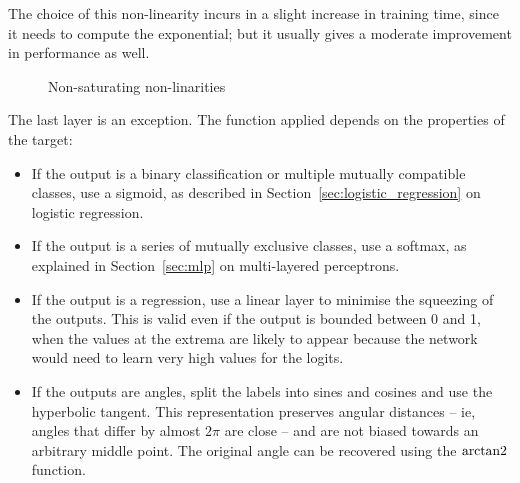 The choice of this non-linearity incurs in a slight increase in training time, since it needs to compute the exponential; but it usually gives a moderate improvement in performance as well.

\begin{figure}[tb]
    \centering
	\hfil
	\caption{Non-saturating non-linarities}\label{fig:non_linear2}
\end{figure}

The last layer is an exception.
The function applied depends on the properties of the target:
\begin{itemize}
\item If the output is a binary classification or multiple mutually compatible classes, use a sigmoid, as described in Section~\ref{sec:logistic_regression} on logistic regression.
\item If the output is a series of mutually exclusive classes, use a softmax, as explained in Section~\ref{sec:mlp} on multi-layered perceptrons.
\item If the output is a regression, use a linear layer to minimise the squeezing of the outputs.
This is valid even if the output is bounded between 0 and 1, when the values at the extrema are likely to appear because the network would need to learn very high values for the logits.
\item If the outputs are angles, split the labels into sines and cosines and use the hyperbolic tangent.
This representation preserves angular distances -- ie, angles that differ by almost $2 \pi$ are close -- and are not biased towards an arbitrary middle point.
The original angle can be recovered using the $\operatorname{arctan2}$ function.
\end{itemize}

